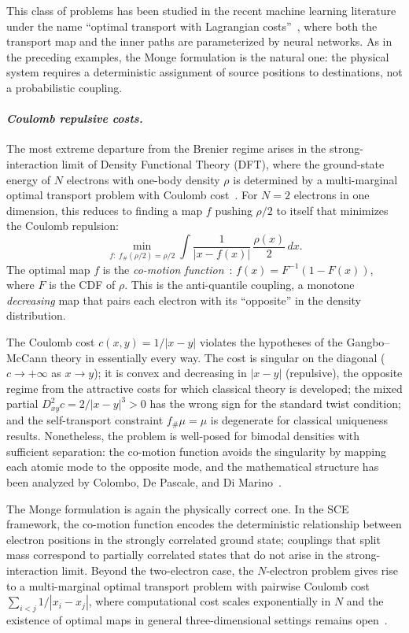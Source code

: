 \documentclass[12pt,leqno]{amsart}
\begin{document}
This class of problems has been studied in the recent machine learning literature under the name ``optimal transport with Lagrangian costs''~\citep{pooladian2024neural,asadulaev2024neural,fan2021scalable}, where both the transport map and the inner paths are parameterized by neural networks. As in the preceding examples, the Monge formulation is the natural one: the physical system requires a deterministic assignment of source positions to destinations, not a probabilistic coupling.

\paragraph{\it Coulomb repulsive costs.}
The most extreme departure from the Brenier regime arises in the strong-interaction limit of Density Functional Theory (DFT), where the ground-state energy of $N$ electrons with one-body density $\rho$ is determined by a multi-marginal optimal transport problem with Coulomb cost~\citep{Seidl1999,ButCDP2012}. For $N = 2$ electrons in one dimension, this reduces to finding a map $f$ pushing $\rho/2$ to itself that minimizes the Coulomb repulsion:
\begin{equation}\label{eq:sce-cost-sec2}
    \min_{f:\; f_\#(\rho/2) = \rho/2} \int \frac{1}{|x - f(x)|}\,\frac{\rho(x)}{2}\,dx.
\end{equation}
The optimal map $f$ is the \emph{co-motion function}~\citep{Seidl1999}: $f(x) = F^{-1}(1 - F(x))$, where $F$ is the CDF of $\rho$. This is the anti-quantile coupling, a monotone \emph{decreasing} map that pairs each electron with its ``opposite'' in the density distribution.

The Coulomb cost $c(x,y) = 1/|x-y|$ violates the hypotheses of the Gangbo--McCann theory in essentially every way. The cost is singular on the diagonal ($c \to +\infty$ as $x \to y$); it is convex and decreasing in $|x-y|$ (repulsive), the opposite regime from the attractive costs for which classical theory is developed; the mixed partial $D^2_{xy}c = 2/|x-y|^3 > 0$ has the wrong sign for the standard twist condition; and the self-transport constraint $f_\# \mu = \mu$ is degenerate for classical uniqueness results. Nonetheless, the problem is well-posed for bimodal densities with sufficient separation: the co-motion function avoids the singularity by mapping each atomic mode to the opposite mode, and the mathematical structure has been analyzed by Colombo, De Pascale, and Di Marino~\citep{ColomboDeP2015}.

The Monge formulation is again the physically correct one. In the SCE framework, the co-motion function encodes the deterministic relationship between electron positions in the strongly correlated ground state; couplings that split mass correspond to partially correlated states that do not arise in the strong-interaction limit. Beyond the two-electron case, the $N$-electron problem gives rise to a multi-marginal optimal transport problem with pairwise Coulomb cost $\sum_{i < j} 1/|x_i - x_j|$, where computational cost scales exponentially in $N$ and the existence of optimal maps in general three-dimensional settings remains open~\citep{ButCDP2012}.
\end{document}
